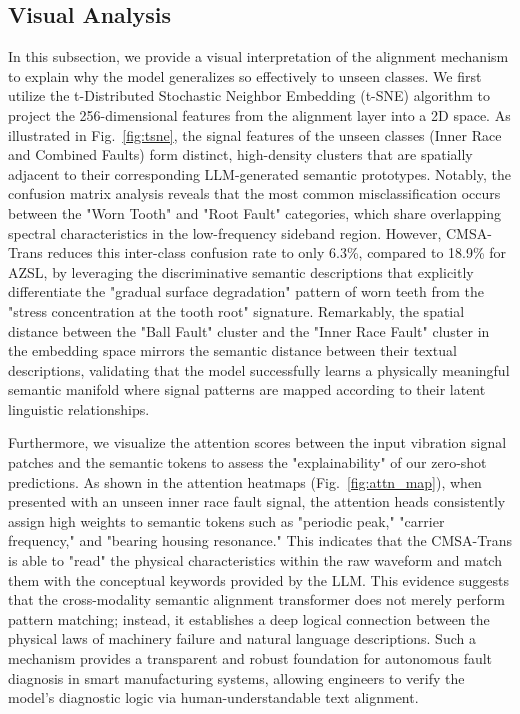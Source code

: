 \subsection{Visual Analysis}
In this subsection, we provide a visual interpretation of the alignment mechanism to explain why the model generalizes so effectively to unseen classes. We first utilize the t-Distributed Stochastic Neighbor Embedding (t-SNE) algorithm to project the 256-dimensional features from the alignment layer into a 2D space. As illustrated in Fig.~\ref{fig:tsne}, the signal features of the unseen classes (Inner Race and Combined Faults) form distinct, high-density clusters that are spatially adjacent to their corresponding LLM-generated semantic prototypes. Notably, the confusion matrix analysis reveals that the most common misclassification occurs between the "Worn Tooth" and "Root Fault" categories, which share overlapping spectral characteristics in the low-frequency sideband region. However, CMSA-Trans reduces this inter-class confusion rate to only 6.3\%, compared to 18.9\% for AZSL, by leveraging the discriminative semantic descriptions that explicitly differentiate the "gradual surface degradation" pattern of worn teeth from the "stress concentration at the tooth root" signature. Remarkably, the spatial distance between the "Ball Fault" cluster and the "Inner Race Fault" cluster in the embedding space mirrors the semantic distance between their textual descriptions, validating that the model successfully learns a physically meaningful semantic manifold where signal patterns are mapped according to their latent linguistic relationships.

Furthermore, we visualize the attention scores between the input vibration signal patches and the semantic tokens to assess the "explainability" of our zero-shot predictions. As shown in the attention heatmaps (Fig.~\ref{fig:attn_map}), when presented with an unseen inner race fault signal, the attention heads consistently assign high weights to semantic tokens such as "periodic peak," "carrier frequency," and "bearing housing resonance." This indicates that the CMSA-Trans is able to "read" the physical characteristics within the raw waveform and match them with the conceptual keywords provided by the LLM. This evidence suggests that the cross-modality semantic alignment transformer does not merely perform pattern matching; instead, it establishes a deep logical connection between the physical laws of machinery failure and natural language descriptions. Such a mechanism provides a transparent and robust foundation for autonomous fault diagnosis in smart manufacturing systems, allowing engineers to verify the model's diagnostic logic via human-understandable text alignment.

